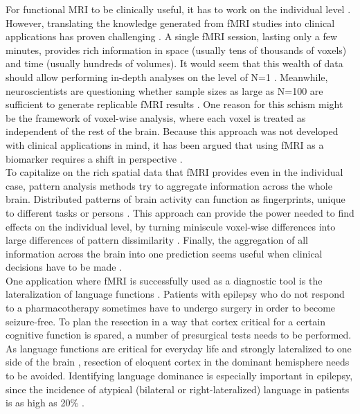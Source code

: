 \documentclass[fleqn,10pt]{SelfArx} %
\begin{document}
For functional MRI to be clinically useful, it has to work on the individual level \citep{Gabrieli_2015, Woo_2017}. However, translating the knowledge generated from fMRI studies into clinical applications has proven challenging \citep{Bandettini_2018}. A single fMRI session, lasting only a few minutes, provides rich information in space (usually tens of thousands of voxels) and time (usually hundreds of volumes). It would seem that this wealth of data should allow performing in-depth analyses on the level of N=1 \citep{Smith_2018}. Meanwhile, neuroscientists are questioning whether sample sizes as large as N=100 are sufficient to generate replicable fMRI results \citep{Turner_2018}. One reason for this schism might be the framework of voxel-wise analysis, where each voxel is treated as independent of the rest of the brain. Because this approach was not developed with clinical applications in mind, it has been argued that using fMRI as a biomarker requires a shift in perspective \citep{Woo_2017, Kragel_2018}.\\
To capitalize on the rich spatial data that fMRI provides even in the individual case, pattern analysis methods try to aggregate information across the whole brain. Distributed patterns of brain activity can function as fingerprints, unique to different tasks or persons \citep{Haxby_2001, Finn_2015}. This approach can provide the power needed to find effects on the individual level, by turning miniscule voxel-wise differences into large differences of pattern dissimilarity \citep{Woo_2017}. Finally, the aggregation of all information across the brain into one prediction seems useful when clinical decisions have to be made \citep{Woo_2017}.\\
One application where fMRI is successfully used as a diagnostic tool is the lateralization of language functions \citep{Bradshaw_2017_task, Szaflarski_2017}. Patients with epilepsy who do not respond to a pharmacotherapy sometimes have to undergo surgery in order to become seizure-free. To plan the resection in a way that cortex critical for a certain cognitive function is spared, a number of presurgical tests needs to be performed. As language functions are critical for everyday life and strongly lateralized to one side of the brain \citep{Frost_1999}, resection of eloquent cortex in the dominant hemisphere needs to be avoided. Identifying language dominance is especially important in epilepsy, since the incidence of atypical (bilateral or right-lateralized) language in patients is as high as 20\% \citep{Springer_1999}.\\
\end{document}
